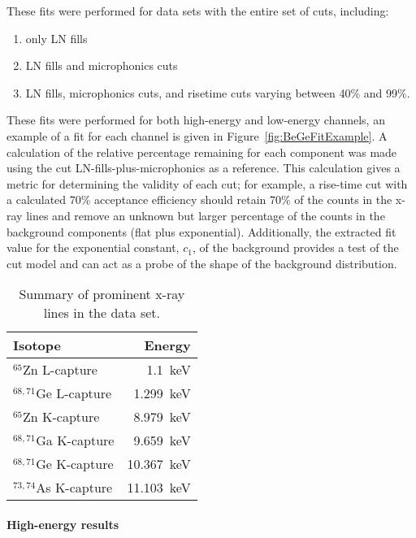 These fits were performed for data sets with the entire set of cuts, including:

					\begin{enumerate}
						\item only LN fills
						\item LN fills and microphonics cuts
						\item LN fills, microphonics cuts, and risetime cuts varying between 40\% and 99\%.
					\end{enumerate}

These fits were performed for both high-energy and low-energy channels, an example of a fit for each channel is given in Figure~\ref{fig:BeGeFitExample}.  A calculation of the relative percentage remaining for each component was made using the cut LN-fills-plus-microphonics as a reference.  This calculation gives a metric for determining the validity of each cut; for example, a rise-time cut with a calculated 70\% acceptance efficiency should retain 70\% of the counts in the x-ray lines and remove an unknown but larger percentage of the counts in the background components (flat plus exponential).  Additionally, the extracted fit value for the exponential constant, $c_{1}$, of the background provides a test of the cut model and can act as a probe of the shape of the background distribution.  
	
					\begin{table}
					\centering
						\begin{tabular}{l|r}
							Isotope & Energy \\
							\hline
							\hline
							$^{65}$Zn L-capture & 1.1~keV \\
							\hline
							$^{68,71}$Ge L-capture & 1.299~keV \\
							\hline
							$^{65}$Zn K-capture & 8.979~keV \\
							\hline
							$^{68,71}$Ga K-capture & 9.659~keV \\
							\hline
							$^{68,71}$Ge K-capture & 10.367~keV \\
							\hline
							$^{73,74}$As K-capture & 11.103~keV \\
							\hline
							\hline
						\end{tabular}	
						\caption{Summary of prominent x-ray lines in the data set.}
						\label{tab:XRayLines}
					\end{table}


					\paragraph{High-energy results}

